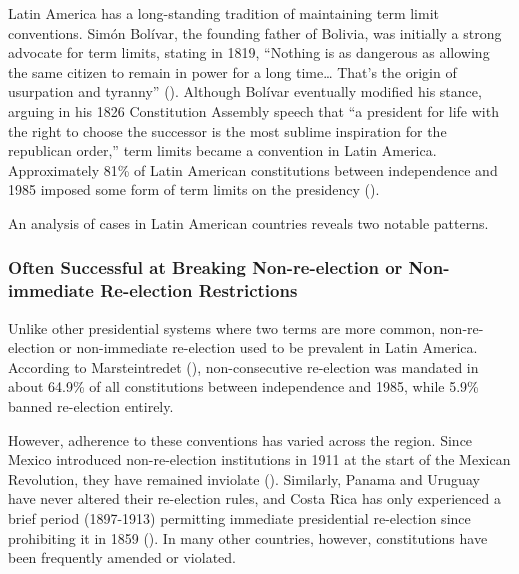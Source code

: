 \documentclass[
  12pt,
]{report}
\begin{document}
Latin America has a long-standing tradition of maintaining term limit
conventions. Simón Bolívar, the founding father of Bolivia, was
initially a strong advocate for term limits, stating in 1819, ``Nothing
is as dangerous as allowing the same citizen to remain in power for a
long time\ldots{} That's the origin of usurpation and tyranny''
(). Although
Bolívar eventually modified his stance, arguing in his 1826 Constitution
Assembly speech that ``a president for life with the right to choose the
successor is the most sublime inspiration for the republican order,''
term limits became a convention in Latin America. Approximately 81\% of
Latin American constitutions between independence and 1985 imposed some
form of term limits on the presidency
().

An analysis of cases in Latin American countries reveals two notable
patterns.

\subsubsection*{Often Successful at Breaking Non-re-election or
Non-immediate Re-election
Restrictions}\label{often-successful-at-breaking-non-re-election-or-non-immediate-re-election-restrictions}

Unlike other presidential systems where two terms are more common,
non-re-election or non-immediate re-election used to be prevalent in
Latin America. According to Marsteintredet
(), non-consecutive re-election
was mandated in about 64.9\% of all constitutions between independence
and 1985, while 5.9\% banned re-election entirely.

However, adherence to these conventions has varied across the region.
Since Mexico introduced non-re-election institutions in 1911 at the
start of the Mexican Revolution, they have remained inviolate
(). Similarly, Panama and
Uruguay have never altered their re-election rules, and Costa Rica has
only experienced a brief period (1897-1913) permitting immediate
presidential re-election since prohibiting it in 1859
(). In many other
countries, however, constitutions have been frequently amended or
violated.
\end{document}
